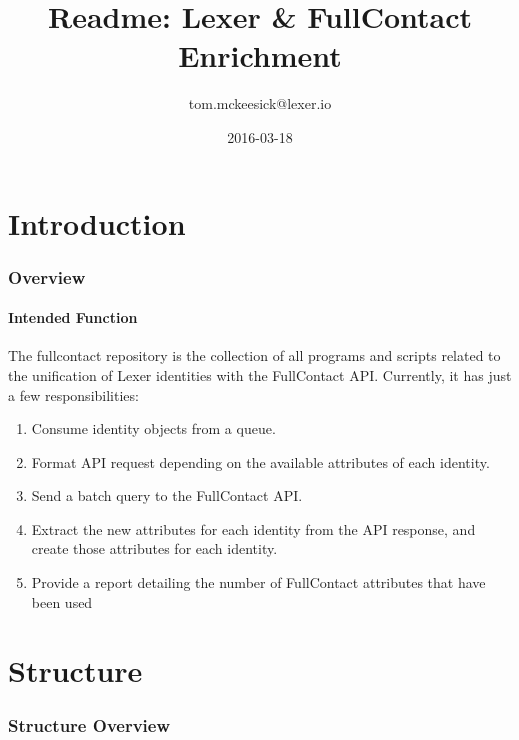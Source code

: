 \documentclass{article}
\title{Readme: Lexer \& FullContact Enrichment}
\author{tom.mckeesick@lexer.io}
\date{2016-03-18}
\begin{document}
\maketitle

\tableofcontents
\cleardoublepage

\part{Introduction}
\section{Overview}
\subsection{Intended Function}
The fullcontact repository is the collection of all programs and scripts related to the unification of Lexer identities with the FullContact API.
Currently, it has just a few responsibilities:
\begin{enumerate}
  \item Consume identity objects from a queue.
  \item Format API request depending on the available attributes of each identity.
  \item Send a batch query to the FullContact API.
 \item Extract the new attributes for each identity from the API response, and create those attributes for each identity.
 \item Provide a report detailing the number of FullContact attributes that have been used
\end{enumerate}

\cleardoublepage

\part{Structure}
\section{Structure Overview}
\end{document}
